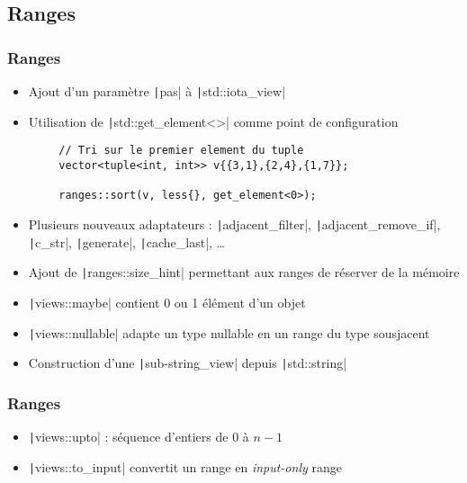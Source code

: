 \documentclass[C++.tex]{subfiles}
\begin{document}
\subsection*{Ranges}
\begin{frame}[fragile]
	\frametitle{Ranges}
	\begin{itemize}
		\item Ajout d'un paramètre \texttt|pas| à \texttt|std::iota_view|
		\item Utilisation de \texttt|std::get_element<>| comme point de configuration
	\end{itemize}

	\begin{verbatim}
		// Tri sur le premier element du tuple
		vector<tuple<int, int>> v{{3,1},{2,4},{1,7}};

		ranges::sort(v, less{}, get_element<0>);
	\end{verbatim}

	\begin{itemize}
		\item Plusieurs nouveaux adaptateurs : \texttt|adjacent_filter|, \texttt|adjacent_remove_if|, \texttt|c_str|, \texttt|generate|,  \texttt|cache_last|, \ldots
		\item Ajout de \texttt|ranges::size_hint| permettant aux ranges de réserver de la mémoire
		\item \texttt|views::maybe| contient 0 ou 1 élément d'un objet
		\item \texttt|views::nullable| adapte un type nullable en un range du type sousjacent
		\item Construction d'une \texttt|sub-string_view| depuis \texttt|std::string|
	\end{itemize}

\end{frame}

\begin{frame}[fragile]
	\frametitle{Ranges}
	\begin{itemize}
		\item \texttt|views::upto| : séquence d'entiers de 0 à $n - 1$
		\item \texttt|views::to_input| convertit un range en \textit{input-only} range
	\end{itemize}

\end{frame}
\end{document}
